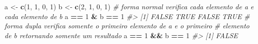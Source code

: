 \documentclass[]{book}
\newenvironment{Shaded}{\begin{snugshade}}{\end{snugshade}}
\newcommand{\KeywordTok}[1]{\textcolor[rgb]{0.13,0.29,0.53}{\textbf{#1}}}
\newcommand{\DecValTok}[1]{\textcolor[rgb]{0.00,0.00,0.81}{#1}}
\newcommand{\StringTok}[1]{\textcolor[rgb]{0.31,0.60,0.02}{#1}}
\newcommand{\CommentTok}[1]{\textcolor[rgb]{0.56,0.35,0.01}{\textit{#1}}}
\newcommand{\OperatorTok}[1]{\textcolor[rgb]{0.81,0.36,0.00}{\textbf{#1}}}
\newcommand{\NormalTok}[1]{#1}
\begin{document}
\begin{Shaded}
\begin{Highlighting}[]
\NormalTok{a <-}\StringTok{ }\KeywordTok{c}\NormalTok{(}\DecValTok{1}\NormalTok{, }\DecValTok{1}\NormalTok{, }\DecValTok{0}\NormalTok{, }\DecValTok{1}\NormalTok{)}
\NormalTok{b <-}\StringTok{ }\KeywordTok{c}\NormalTok{(}\DecValTok{2}\NormalTok{, }\DecValTok{1}\NormalTok{, }\DecValTok{0}\NormalTok{, }\DecValTok{1}\NormalTok{)}
\CommentTok{# forma normal verifica cada elemento de a e cada elemento de b}
\NormalTok{a }\OperatorTok{==}\StringTok{ }\DecValTok{1} \OperatorTok{&}\StringTok{ }\NormalTok{b }\OperatorTok{==}\StringTok{ }\DecValTok{1}
\CommentTok{#> [1] FALSE  TRUE FALSE  TRUE}
\CommentTok{# forma dupla verifica somente o primeiro elemento de a e o primeiro}
\CommentTok{# elemento de b retornando somente um resultado}
\NormalTok{a }\OperatorTok{==}\StringTok{ }\DecValTok{1} \OperatorTok{&&}\StringTok{ }\NormalTok{b }\OperatorTok{==}\StringTok{ }\DecValTok{1}
\CommentTok{#> [1] FALSE}
\end{Highlighting}
\end{Shaded}
\end{document}
